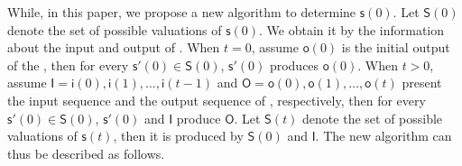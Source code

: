 While, in this paper, we propose a new algorithm to determine $\mathsf{s}(0)$. %
Let $\mathsf{S}(0)$ denote the set of possible valuations of $\mathsf{s}(0)$. We obtain it by the information about the input and output of \BCN. When $t=0$, assume $\mathsf{o}(0)$ is the initial output of the \BCN, then for every $\mathsf{s}'(0)\in\mathsf{S}(0)$, $\mathsf{s}'(0)$ produces $\mathsf{o}(0)$. When $t>0$, assume $\mathsf{I}=\mathsf{i}(0),\mathsf{i}(1),\ldots,\mathsf{i}(t-1)$ and $\mathsf{O}=\mathsf{o}(0),\mathsf{o}(1),\ldots,\mathsf{o}(t)$ present the input sequence and the output sequence of \BCN, respectively, then for every $\mathsf{s}'(0)\in\mathsf{S}(0)$, $\mathsf{s}'(0)$ and $\mathsf{I}$  produce  $\mathsf{O}$. Let $\mathsf{S}(t)$ denote the set of possible valuations of $\mathsf{s}(t)$, then it is produced by $\mathsf{S}(0)$ and $\mathsf{I}$.
The new algorithm can thus be described as follows. 



